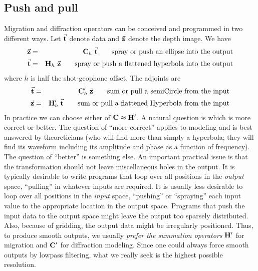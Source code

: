 \subsection{Push and pull}

\par
Migration and diffraction operators can be conceived
and programmed in two different ways.
Let $\vec {\bold t}$ denote data and $\vec {\bold z}$ denote the depth image.
We have
\begin{eqnarray}
\vec {\bold z} &=& \bold C_h\ \vec {\bold t}
        \quad\quad {\rm spray\ or\ push\ an\ ellipse\ into\ the\ output}
 \\
\vec {\bold t} &=& \bold H_h\ \vec {\bold z}
\quad\quad {\rm spray\ or\ push\ a\ flattened\ hyperbola\ into\ the\ output}
\end{eqnarray}
where $h$ is half the shot-geophone offset.
The adjoints are
\begin{eqnarray}
\vec {\bold t} &=& \bold C_h' \; \vec {\bold z} \quad\quad
	{\rm sum\ or\ pull\ a\ semiCircle\ from\ the\ input}
	\\
\vec {\bold z} &=& \bold H_h' \; \vec {\bold t} \quad\quad
	{\rm sum\ or\ pull\ a\ flattened\ Hyperbola\ from\ the\ input}
\end{eqnarray}
In practice we can choose either of $\bold C \approx \bold H'$.
A natural question is which is more correct or better.
The question of ``more correct''
applies to modeling and is best answered by theoreticians
(who will find more than simply a hyperbola;
they will find its waveform including its amplitude and phase
as a function of frequency).
The question of ``better'' is something else.
An important practical issue is that the transformation
should not leave miscellaneous holes in the output.
It is typically desirable to write programs that
loop over all positions in the {\em  output} space,
``pulling'' in whatever inputs are required.
It is usually less desirable
to loop over all positions in the {\em  input} space,
``pushing'' or ``spraying'' each input value to the appropriate
location in the output space.
Programs that push the input data to the output space
might leave the output
too sparsely distributed.
Also, because of gridding, the output data might be irregularly positioned.
Thus, to produce smooth outputs, we usually
{\em  prefer the summation operators}
$\bold H'$ for migration and $\bold C'$ for diffraction modeling.
Since one could always force smooth outputs by lowpass filtering,
what we really seek is the highest possible resolution.

